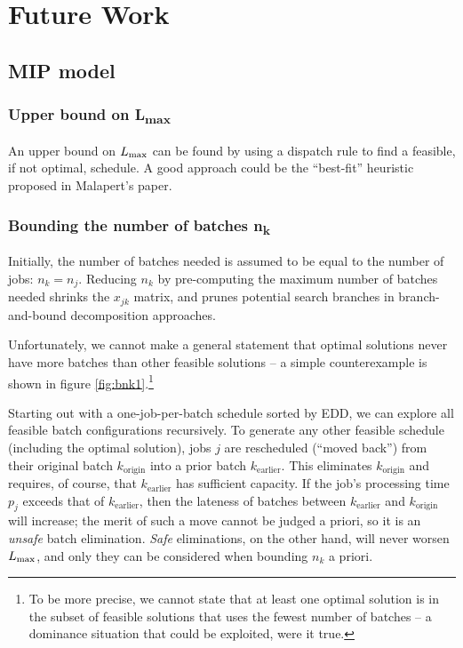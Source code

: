 \chapter{Future Work}\label{sec:futurework}
\section{MIP model}
\subsection[Upper bound on $\Lmax$]{Upper bound on {\sansitalicfont L}\textsubscript{max}}
An upper bound on $\Lmax$ can be found by using a dispatch rule to find a
feasible, if not optimal, schedule. A good approach could be the ``best-fit''
heuristic proposed in Malapert's paper. 

\subsection[Bounding the number of batches $n_k$]{Bounding the number of batches
\sansitalicfont n\textsubscript{k}}\label{sec:bounding_nk}
Initially, the number of batches needed is assumed to be equal to the number of
jobs: $n_k = n_j$. Reducing $n_k$ by pre-computing the maximum number of batches
needed shrinks the $x_{jk}$ matrix, and prunes potential search branches in
branch-and-bound decomposition approaches.


Unfortunately, we cannot make a general statement that optimal solutions never
have more batches than other feasible solutions -- a simple counterexample is
shown in figure \ref{fig:bnk1}.\footnote{To be more precise, we cannot state
that at least one optimal solution is in the subset of feasible solutions that
uses the fewest number of batches -- a dominance situation that could be
exploited, were it true.}

Starting out with a one-job-per-batch schedule sorted by EDD, we can explore
all feasible batch configurations recursively. To generate any other feasible
schedule (including the optimal solution), jobs $j$ are rescheduled (``moved back'')
from their original batch $k_\text{origin}$ into a prior batch
$k_\text{earlier}$. This eliminates $k_\text{origin}$ and requires, of course,
that $k_\text{earlier}$ has sufficient capacity. If the job's processing time
$p_j$ exceeds that of $k_\text{earlier}$, then the lateness of batches between
$k_\text{earlier}$ and $k_\text{origin}$ will increase; the merit of such a move
cannot be judged a priori, so it is an \textit{unsafe} batch elimination.
\textit{Safe} eliminations, on the other hand, will never worsen $\Lmax$, and
only they can be considered when bounding $n_k$ a priori.

